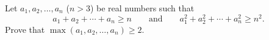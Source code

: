 Let $a_{1}, a_{2}, \dots, a_{n}$ ($n > 3$) be real numbers such that \[ a_{1} + a_{2} + \cdots + a_{n} \geq n \qquad \mbox{and} \qquad a_{1}^{2} + a_{2}^{2} + \cdots + a_{n}^{2} \geq n^{2}.  \] Prove that $\max(a_{1}, a_{2}, \dots, a_{n}) \geq 2$.
